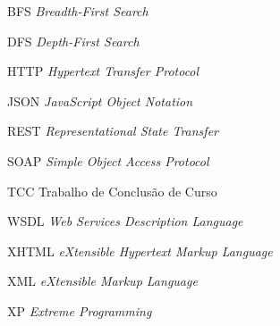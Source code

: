 \begin{siglas}
  \item[BFS] \textit{Breadth-First Search}
  \item[DFS] \textit{Depth-First Search}
  \item[HTTP] \textit{Hypertext Transfer Protocol}
  \item[JSON] \textit{JavaScript Object Notation}
  \item[REST] \textit{Representational State Transfer}
  \item[SOAP] \textit{Simple Object Access Protocol}
  \item[TCC] Trabalho de Conclusão de Curso
  \item[WSDL] \textit{Web Services Description Language}
  \item[XHTML] \textit{eXtensible Hypertext Markup Language}
  \item[XML] \textit{eXtensible Markup Language}
  \item[XP] \textit{Extreme Programming}
\end{siglas}
